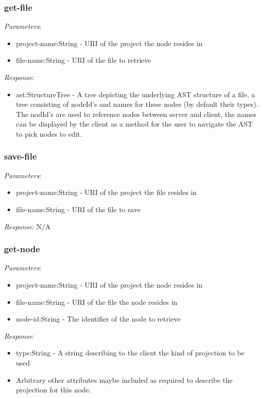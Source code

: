 \documentclass{report}
\begin{document}
\subsubsection{get-file}
\emph{Parameters}: 
\begin{itemize}
\item project-name:String - URI of the project the node resides in
\item file-name:String - URI of the file to retrieve
\end{itemize}
\emph{Response}: 
\begin{itemize}
\item ast:StructureTree - A tree depicting the underlying AST structure of a file, a tree consisting of nodeId's and names for these nodes (by default their types). The nodId's are used to reference nodes between server and client, the names can be displayed by the client as a method for the user to navigate the AST to pick nodes to edit.
\end{itemize}

\subsubsection{save-file}
\emph{Parameters}: 
\begin{itemize}
\item project-name:String - URI of the project the file resides in
\item file-name:String - URI of the file to save
\end{itemize}
\emph{Response}: N/A

\subsubsection{get-node}
\emph{Parameters}: 
\begin{itemize}
\item project-name:String - URI of the project the node resides in
\item file-name:String - URI of the file the node resides in
\item node-id:String - The identifier of the node to retrieve
\end{itemize}
\emph{Response}: 
\begin{itemize}
\item type:String - A string describing to the client the kind of projection to be used
\item Arbitrary other attributes maybe included as required to describe the projection for this node.
\end{itemize}
\end{document}
